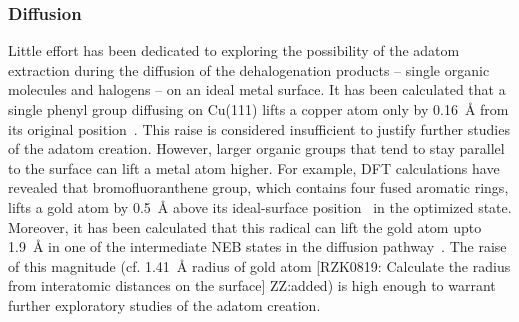 \documentclass[%
 reprint,
 amsmath,amssymb,
 aps,
prb,
floatfix,
]{revtex4-2}
\newcommand{\lock}{\color{red}}
\newcommand{\zhzh}{\color{blue}}
\newcommand{\lock}{\color{black}}
\newcommand{\zhzh}{\color{blue}}
\newcommand{\comm}{\color{ForestGreen}} %
\begin{document}
\ifdefined\INTERNAL

\subsubsection{Diffusion}


\fi

{\lock

Little effort has been dedicated to exploring the possibility of the adatom extraction during the diffusion of the dehalogenation products  -- single organic molecules and halogens -- on an ideal metal surface. 
%
%
It has been calculated that a single phenyl group diffusing on Cu(111) lifts a copper atom only by \SI{0.16}{\angstrom} from its original position~\cite{pccp2010}. 
This raise is considered insufficient to justify further studies of the adatom creation.
However, larger organic groups that tend to stay parallel to the surface can lift a metal atom higher. 
For example, DFT calculations have revealed that bromofluoranthene group, which contains four fused aromatic rings, lifts a gold atom by \SI{0.5}{\angstrom} above its ideal-surface position~\cite{jpcc2018} in the optimized state. 
Moreover, it has been calculated that this radical can lift the gold atom upto \SI{1.9}{\angstrom} in one of the intermediate NEB states in the diffusion pathway~\cite{jpcc2018}.
The raise of this magnitude (cf. \SI{1.41}{\angstrom} radius of gold atom {\comm[RZK0819: Calculate the radius from interatomic distances on the surface]} {\zhzh ZZ:added}) is high enough to warrant further exploratory studies of the adatom creation.


}
\end{document}
